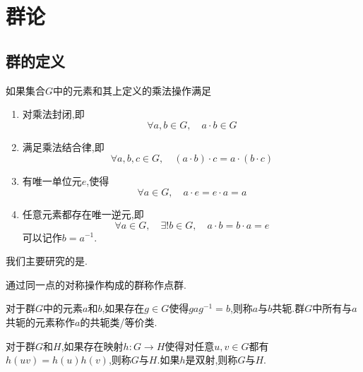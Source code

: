 \documentclass{ctexbook}
\begin{document}
\section{群论}
\subsection{群的定义}
\begin{definition}[群]
    如果集合$G$中的元素和其上定义的乘法操作满足
    \begin{enumerate}[label=\tbf{\alph*.}]
        \item 对乘法封闭,即
        \[\forall a,b\in G,\quad a\cdot b\in G\]
        \item 满足乘法结合律,即
        \[\forall a,b,c\in G,\quad (a\cdot b)\cdot c=a\cdot(b\cdot c)\]
        \item 有唯一单位元$e$,使得
        \[\forall a\in G,\quad a\cdot e=e\cdot a=a\]
        \item 任意元素都存在唯一逆元,即
        \[\forall a\in G,\quad \exists!b\in G,\quad a\cdot b=b\cdot a=e\]
        可以记作$b=a^{-1}$.
    \end{enumerate}
\end{definition}
我们主要研究的是.
\begin{definition}[点群]
    通过同一点的对称操作构成的群称作点群.
\end{definition}
\begin{definition}[类]
    对于群$G$中的元素$a$和$b$,如果存在$g\in G$使得$gag^{-1}=b$,则称$a$与$b$共轭.群$G$中所有与$a$共轭的元素称作$a$的共轭类/等价类.
\end{definition}
\begin{definition}[同态与同构]
    对于群$G$和$H$,如果存在映射$h:G\to H$使得对任意$u,v\in G$都有$h(uv)=h(u)h(v)$,则称$G$与$H$.如果$h$是双射,则称$G$与$H$.
\end{definition}
\end{document}
